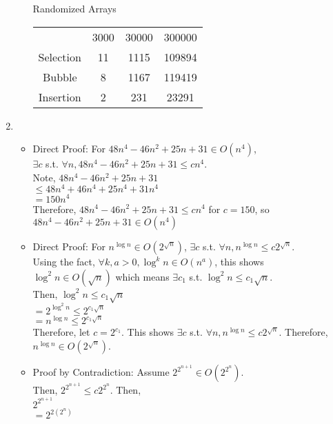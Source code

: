 \documentclass{article}
\begin{document}
\begin{enumerate}
\begin{enumerate}
			\center Randomized Arrays
			\begin{center}
			\begin{tabular}{ |c|c|c|c|}
				\hline
				 & 3000 & 30000 & 300000\\
				Selection & 11 & 1115 & 109894\\
				Bubble & 8 & 1167 & 119419\\
				Insertion & 2 & 231 & 23291\\
				\hline
			\end{tabular}
			\end{center}
		\end{enumerate}
		\item %
		\begin{itemize}
			\item Direct Proof: For  $48n^4-46n^2+25n+31\in O(n^4)$, \\
			$\exists c$ s.t. $\forall n, 48n^4-46n^2+25n+31\leq cn^4$.\\
			Note, $48n^4-46n^2+25n+31$\\
			$\leq 48n^4+46n^4+25n^4+31n^4$\\
			$=150n^4$\\
			Therefore,  $48n^4-46n^2+25n+31\leq cn^4$ for $c=150$, so \\
			$48n^4-46n^2+25n+31\in O(n^4)$\\
			\item Direct Proof:  For $n^{\log n}\in O(2^{\sqrt n})$, 
			$\exists c$ s.t. $\forall n, n^{\log n}\leq c2^{\sqrt n}$.\\
			Using the fact, $\forall k, a>0, \log ^k n\in O(n^a)$, this shows\\ 
			$\log ^2n\in O(\sqrt n)$ which means $\exists c_1$ s.t. $\log ^2n \leq c_1\sqrt n$. \\
			Then, $\log ^2n \leq c_1\sqrt n$\\
			$=2^{\log ^2n}\leq 2^{c_1\sqrt n}$\\
			$=n^{\log n}\leq 2^{c_1\sqrt n}$\\
			Therefore, let $c=2^{c_1}$. This shows $\exists c$ s.t. $\forall n, n^{\log n}\leq 
			c2^{\sqrt n}$. Therefore, $n^{\log n}\in O(2^{\sqrt n})$.\\
			\item Proof by Contradiction: Assume $2^{2^{n+1}}\in O(2^{2^n})$. \\
			Then, $2^{2^{n+1}}\leq c2^{2^n}$. Then,\\
			$2^{2^{n+1}}$\\
			$=2^{2(2^n)}$\\

\end{itemize}
\end{enumerate}
\end{document}
